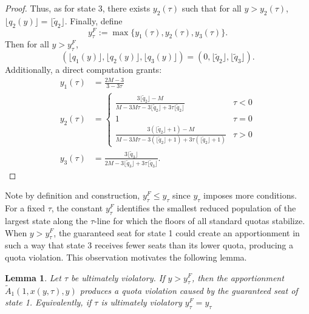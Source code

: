 \documentclass[11pt]{article}
\newtheorem{lemma}[theorem]{Lemma}
\theoremstyle{definition}
\theoremstyle{definition}
\begin{document}
\begin{proof}
Thus, as for state 3, there exists $y_2(\tau)$ such that for all $y > y_2(\tau)$,
$\lfloor q_2(y) \rfloor = \lfloor \tilde q_2 \rfloor.$
Finally, define
$$y_{\tau}^F := \max\{y_1(\tau), y_2(\tau), y_3(\tau)\}.$$
Then for all $y > y_{\tau}^F$,
$$(\lfloor q_1(y)\rfloor, \lfloor q_2(y)\rfloor, \lfloor q_3(y)\rfloor)
=\left(0, \lfloor \tilde q_2 \rfloor, \lfloor \tilde q_3 \rfloor\right).$$
Additionally, a direct computation grants:
\begin{align*}
y_1(\tau) &= \frac{2M-3}{3-3\tau}\\
y_2(\tau) &= \left\{ \begin{array}{lcl} \frac{3 \lfloor \tilde{q}_2 \rfloor -M}{M-3M\tau-3\lfloor \tilde{q}_2 \rfloor+3\tau \lfloor \tilde{q}_2 \rfloor} & \tau<0 \\ 1 &\tau=0 \\ \frac{3 (\lfloor \tilde{q}_2 \rfloor+1) -M}{M-3M\tau-3(\lfloor \tilde{q}_2 \rfloor+1)+3\tau (\lfloor\tilde{q}_2 \rfloor+1)} & \tau >0  \end{array} \right. \\
y_3(\tau) &= \frac{3 \lfloor \tilde{q}_3 \rfloor}{2M-3\lfloor \tilde{q}_3 \rfloor +3\tau\lfloor \tilde{q}_3 \rfloor}.
\end{align*}

\end{proof}

Note by definition and construction, $y_{\tau}^F \leq y_\tau$ since $y_\tau$ imposes more conditions. For a fixed $\tau$, the constant $y_{\tau}^F$ identifies the smallest reduced population of the largest state along the $\tau$-line for which the floors of all standard quotas stabilize. When $y > y_{\tau}^F$, the guaranteed seat for state 1 could create an apportionment in such a way that state 3 receives fewer seats than its lower quota, producing a quota violation. This observation motivates the following lemma.

\begin{lemma}\label{y_tau.violation}
Let $\tau$ be ultimately violatory. If $y > y_{\tau}^F$, then the apportionment $\tilde A_1(1, x(y,\tau), y)$ produces a quota violation caused by the guaranteed seat of state 1. Equivalently, if $\tau$ is ultimately violatory $y_\tau^F = y_\tau$
\end{lemma}
\end{document}
